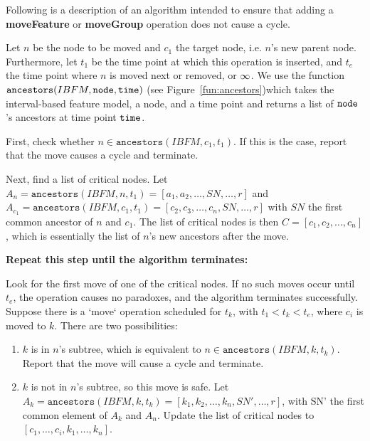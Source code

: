 Following is a description of an algorithm intended to ensure that adding a \textbf{moveFeature} or \textbf{moveGroup} operation does not cause a cycle.

Let $n$ be the node to be moved and $c_1$ the target node, i.e. $n$'s new parent node. Furthermore, let $t_1$ be the time point at which this operation is inserted, and $t_e$ the time point where $n$ is moved next or removed, or $\infty$. We use the function $\texttt{ancestors}(IBFM, \texttt{node}, \texttt{time})$ (see Figure~\vref{fun:ancestors})which takes the interval-based feature model, a node, and a time point and returns a list of $\texttt{node}$'s ancestors at time point $\texttt{time}$. 

First, check whether $n \in \texttt{ancestors}(IBFM, c_1, t_1)$. If this is the case, report that the move causes a cycle and terminate. 

Next, find a list of critical nodes. 
Let $A_n = \texttt{ancestors}(IBFM, n, t_1) = [a_1, a_2, \dots, SN, \dots, r]$ and $A_{c_1} = \texttt{ancestors}(IBFM, c_1, t_1) = [c_2, c_3, \dots, c_n, SN, \dots, r]$ with $SN$ the first common ancestor of $n$ and $c_1$. The list of critical nodes is then $C = [c_1, c_2, \dots, c_n]$, which is essentially the list of $n$'s new ancestors after the move. 

\textbf{Repeat this step until the algorithm terminates:}

Look for the first move of one of the critical nodes. If no such moves occur until $t_e$, the operation causes no paradoxes, and the algorithm terminates successfully.  
  Suppose there is a `move` operation scheduled for $t_k$, with $t_1 < t_k < t_e$, where $c_i$ is moved to $k$. There are two possibilities:  
  \begin{enumerate}
    \item $k$ is in $n$'s subtree, which is equivalent to $n \in \texttt{ancestors}(IBFM, k, t_k)$. Report that the move will cause a cycle and terminate. 
\item $k$ is not in $n$'s subtree, so this move is safe. Let $A_k = \texttt{ancestors}(IBFM, k, t_k) = [k_1, k_2, \dots, k_n, SN', \dots, r]$, with SN' the first common element of $A_k$ and $A_n$. Update the list of critical nodes to $[c_1, \dots, c_i, k_1, \dots, k_n]$.
  \end{enumerate}

